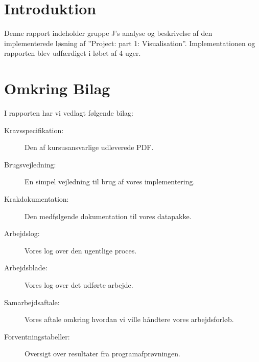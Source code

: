 \section{Introduktion}
Denne rapport indeholder gruppe J's analyse og beskrivelse af den implementerede løsning af ''Project: part 1: Visualisation''. Implementationen og rapporten blev udfærdiget i løbet af 4 uger.
\section{Omkring Bilag}
I rapporten har vi vedlagt følgende bilag:
\begin{description}
	\item[Kravsspecifikation:] Den af kursusansvarlige udleverede PDF.
	\item[Brugsvejledning:] En simpel vejledning til brug af vores implementering.
	\item[Krakdokumentation:] Den medfølgende dokumentation til vores datapakke.
	\item[Arbejdslog:] Vores log over den ugentlige proces.
	\item[Arbejdsblade:] Vores log over det udførte arbejde.
	\item[Samarbejdsaftale:] Vores aftale omkring hvordan vi ville håndtere vores arbejdsforløb.
	\item[Forventningstabeller:] Oversigt over resultater fra programafprøvningen.
\end{description}

